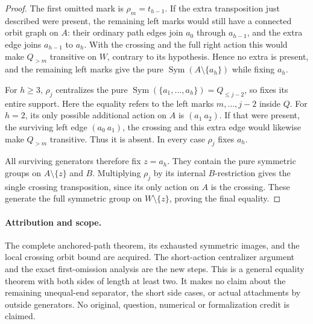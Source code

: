 \documentclass[11pt,a4paper]{article}
\newcommand{\Sym}{\operatorname{Sym}}
\begin{document}
\begin{proof}
The first omitted mark is $\rho_m=t_{h-1}$.
If the extra transposition just described were
present, the remaining left marks would still
have a connected orbit graph on $A$: their
ordinary path edges join $a_0$ through $a_{h-1}$,
and the extra edge joins $a_{h-1}$ to $a_h$.
With the crossing and the full right action this
would make $Q_{>m}$ transitive on $W$, contrary
to its hypothesis. Hence no extra is present,
and the remaining left marks give the pure
$\Sym(A\setminus\{a_h\})$ while fixing $a_h$.

For $h\ge3$, $\rho_j$ centralizes the pure
$\Sym(\{a_1,\ldots,a_h\})=Q_{\le j-2}$,
so fixes its entire support. Here the equality
refers to the left marks $m,\ldots,j-2$ inside
$Q$. For $h=2$, its only possible additional
action on $A$ is $(a_1\ a_2)$. If that were
present, the surviving left edge $(a_0\ a_1)$,
the crossing and this extra edge would likewise
make $Q_{>m}$ transitive. Thus it is absent.
In every case $\rho_j$ fixes $a_h$.

All surviving generators therefore fix $z=a_h$.
They contain the pure symmetric groups on
$A\setminus\{z\}$ and $B$. Multiplying
$\rho_j$ by its internal $B$-restriction gives
the single crossing transposition, since its
only action on $A$ is the crossing. These
generate the full symmetric group on
$W\setminus\{z\}$, proving the final equality.
\end{proof}

\paragraph{Attribution and scope.}
The complete anchored-path theorem, its exhausted
symmetric images, and the local crossing orbit bound
are acquired. The short-action centralizer argument
and the exact first-omission analysis are the new
steps. This is a general equality theorem with both
sides of length at least two. It makes no claim
about the remaining unequal-end separator, the
short side cases, or actual attachments by outside
generators. No original, question, numerical or
formalization credit is claimed.
\end{document}
